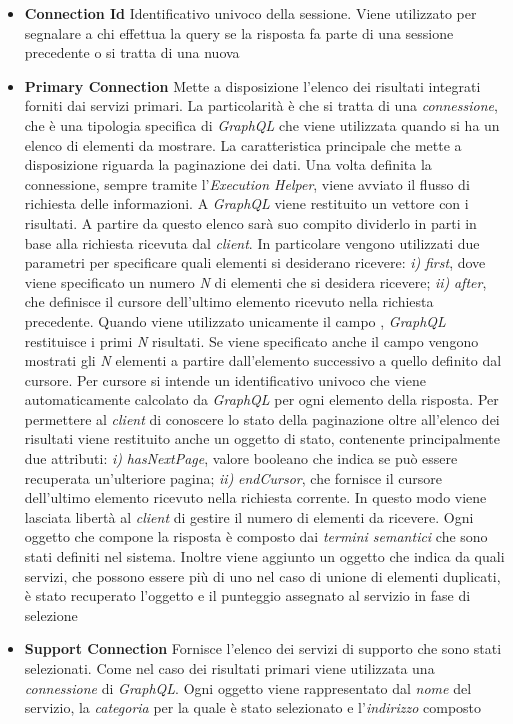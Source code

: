 \begin{itemize}
	\item \textbf{Connection Id}
	Identificativo univoco della sessione. Viene utilizzato per segnalare a chi effettua la query se la risposta fa parte di una sessione precedente o si tratta di una nuova
	\item \textbf{Primary Connection}
	Mette a disposizione l'elenco dei risultati integrati forniti dai servizi primari. La particolarità è che si tratta di una \emph{connessione}, che è una tipologia specifica di \emph{GraphQL} che viene utilizzata quando si ha un elenco di elementi da mostrare. La caratteristica principale che mette a disposizione riguarda la paginazione dei dati. Una volta definita la connessione, sempre tramite l'\emph{Execution Helper}, viene avviato il flusso di richiesta delle informazioni. A \emph{GraphQL} viene restituito un vettore con i risultati. A partire da questo elenco sarà suo compito dividerlo in parti in base alla richiesta ricevuta dal \emph{client}. In particolare vengono utilizzati due parametri per specificare quali elementi si desiderano ricevere: \emph{i)} \emph{first}, dove viene specificato un numero \emph{N} di elementi che si desidera ricevere; \emph{ii)} \emph{after}, che definisce il cursore dell'ultimo elemento ricevuto nella richiesta precedente. Quando viene utilizzato unicamente il campo , \emph{GraphQL} restituisce i primi \emph{N} risultati. Se viene specificato anche il campo  vengono mostrati gli \emph{N} elementi a partire dall'elemento successivo a quello definito dal cursore. Per cursore si intende un identificativo univoco che viene automaticamente calcolato da \emph{GraphQL} per ogni elemento della risposta. Per permettere al \emph{client} di conoscere lo stato della paginazione oltre all'elenco dei risultati viene restituito anche un oggetto di stato, contenente principalmente due attributi: \emph{i)} \emph{hasNextPage}, valore booleano che indica se può essere recuperata un'ulteriore pagina; \emph{ii)} \emph{endCursor}, che fornisce il cursore dell'ultimo elemento ricevuto nella richiesta corrente. In questo modo viene lasciata libertà al \emph{client} di gestire il numero di elementi da ricevere. Ogni oggetto che compone la risposta è composto dai \emph{termini semantici} che sono stati definiti nel sistema. Inoltre viene aggiunto un oggetto che indica da quali servizi, che possono essere più di uno nel caso di unione di elementi duplicati, è stato recuperato l'oggetto e il punteggio assegnato al servizio in fase di selezione
	\item \textbf{Support Connection}
	Fornisce l'elenco dei servizi di supporto che sono stati selezionati. Come nel caso dei risultati primari viene utilizzata una \emph{connessione} di \emph{GraphQL}. Ogni oggetto viene rappresentato dal \emph{nome} del servizio, la \emph{categoria} per la quale è stato selezionato e l'\emph{indirizzo} composto
\end{itemize}

